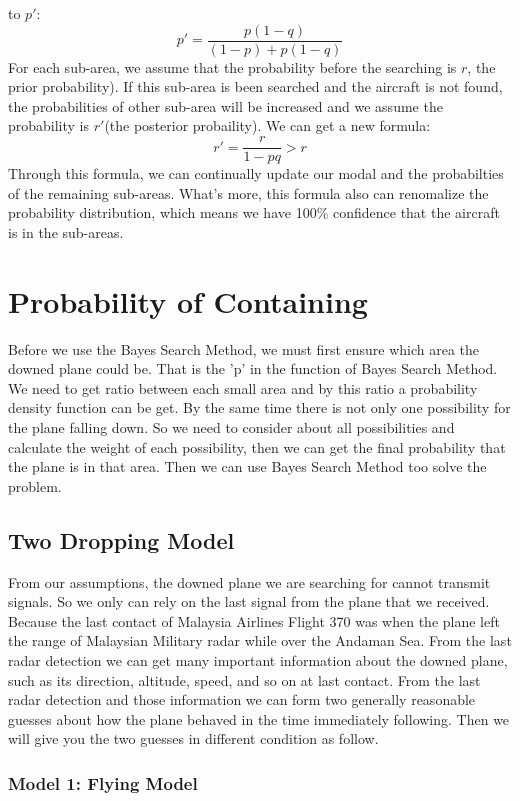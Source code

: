 \documentclass[11pt]{article}
\begin{document}
to \(p'\): \[p' = \frac{p(1-q)}{(1-p)+p(1-q)}\] For each sub-area, we
assume that the probability before the searching is \(r\), the prior
probability). If this sub-area is been searched and the aircraft is not
found, the probabilities of other sub-area will be increased and we
assume the probability is \(r'\)(the posterior probaility). We can get a
new formula: \[r' = \frac{r}{1-pq} > r\] Through this formula, we can
continually update our modal and the probabilties of the remaining
sub-areas. What's more, this formula also can renomalize the probability
distribution, which means we have 100\% confidence that the aircraft is
in the sub-areas.\\
    \hypertarget{Probability of Containing}{%
\section{Probability of Containing}\label{Probability of Containing}}
Before we use the Bayes Search Method, we must first ensure which area the downed plane could be. That is the 'p' in the function of Bayes Search Method. We need to get ratio between each small area and by this ratio a probability density function can be get. By the same time there is not only one possibility  for the plane falling down. So we need to consider about all possibilities and calculate the weight of each possibility, then we can get the final probability that the plane is in that area. Then we can use Bayes Search Method too solve the problem.
\hypertarget{Two Dropping Model}{%
\subsection{Two Dropping Model}\label{Two Dropping Model}}
From our assumptions, the downed plane we are searching for cannot transmit signals.  So we only can rely on the last signal from the plane that we received. Because the last contact of Malaysia Airlines Flight 370 was when the plane left the range of Malaysian Military radar while over the Andaman Sea. From the last radar detection we can get many important information about the downed plane, such as its direction, altitude, speed, and so on at last contact. From the last radar detection and those information we can form two generally reasonable guesses about how the plane behaved in the time immediately following. Then we will give you the two guesses in different condition as follow.
\hypertarget{Model 1: Flying Model}{%
\subsubsection{Model 1: Flying Model}\label{ Model 1: Flying Model}}
\end{document}
